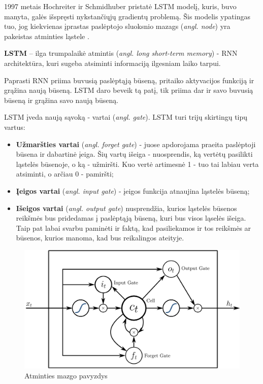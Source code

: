 \documentclass{VUMIFPSbakalaurinis}
\begin{document}
1997 metais Hochreiter ir Schmidhuber pristatė LSTM modelį, kuris, buvo manyta, galės išspręsti nykstančiųjų gradientų problemą. Šis modelis ypatingas tuo, jog kiekvienas įprastas paslėptojo sluoksnio mazags (\textit{angl. node}) yra pakeistas atminties ląstele \cite{DBLP:journals/corr/Lipton15}.

\textbf{LSTM} – ilga trumpalaikė atmintis (\textit{angl. long short-term memory}) - RNN architektūra, kuri sugeba atsiminti informaciją ilgesniam laiko tarpui. 

Paprasti RNN priima buvusią paslėptąją būseną, pritaiko aktyvacijos funkciją ir grąžina naują būseną. LSTM daro beveik tą patį, tik priima dar ir savo buvusią būseną ir grąžina savo naują būseną. 

LSTM įveda naują sąvoką - vartai (\textit{angl. gate}). LSTM turi trijų skirtingų tipų vartus:

\begin{itemize}
	\item \textbf{Užmaršties vartai} (\textit{angl. forget gate}) - juose apdorojama praeita paslėptoji būsena ir dabartinė įeiga. Šių vartų išeiga - nuosprendis, ką vertėtų pasilikti ląstelės būsenoje, o ką - užmiršti. Kuo vertė artimesnė 1 - tuo tai labiau verta atsiminti, o arčiau 0 - pamiršti;
	\item \textbf{Įeigos vartai} (\textit{angl. input gate}) - įeigos funkcija atnaujina ląstelės būseną;
	\item \textbf{Išeigos vartai} (\textit{angl. output gate}) nusprendžia, kurios ląstelės būsenos reikšmės bus pridedamas į paslėptąją būseną, kuri bus visos ląselės išeiga. Taip pat labai svarbu paminėti ir faktą, kad pasiliekamos ir tos reikšmės ar būsenos, kurios manoma, kad bus reikalingos ateityje.
\end{itemize}

\begin{figure}[H]
	\centering
	\includegraphics[scale=0.12]{img/lstm}
	\caption{Atminties mazgo pavyzdys}
	\label{img:lstm}
\end{figure}
\end{document}
